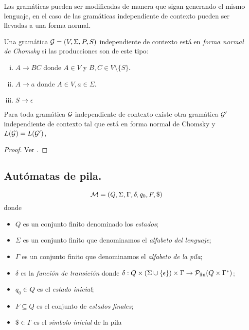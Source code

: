 \documentclass[tesis.tex]{subfiles}
\begin{document}
Las gramáticas pueden ser modificadas de manera que sigan generando el mismo lenguaje, en el caso de las gramáticas independiente de contexto pueden ser llevadas a una forma normal.

\begin{deff}
	Una gramática ${\cal G} = (V, \Sigma, P, S)$ independiente de contexto está en \emph{forma normal de Chomsky} si las producciones son de este tipo:
	\begin{enumerate}[i)]
		\item $A \to BC$ donde $A\in V$ y $B,C \in V \setminus \{ S \}$.
		\item $A \to a$ donde $A \in V, a \in \Sigma$.
		\item $S \to \epsilon$ 
	\end{enumerate}
\end{deff}

\begin{prop}\label{prop_fn_Chomsky}
	Para toda gramática $\cal G$ independiente de contexto existe otra gramática $\cal G'$ independiente de contexto tal que está en forma normal de Chomsky y $L({\cal G}) = L(\cal G')$,
\end{prop}

\begin{proof}
	Ver \cite[pp.274-275]{hopcraft-ullman}.
\end{proof}





\subsection{Autómatas de pila.}
\begin{deff}\label{deff_apnd}
	\[
	{\cal M } = (Q, \Sigma, \Gamma, \delta, q_0, F, \$)
	\]
	donde 
	\begin{itemize}
		\item $Q$ es un conjunto finito denominado los \emph{estados};
		\item $\Sigma$ es un conjunto finito que denominamos el \emph{alfabeto del lenguaje};
		\item $\Gamma$ es un conjunto finito que denominamos el \emph{alfabeto de la pila};
		\item $\delta$ es la \emph{función de transición} donde $\delta: Q  \times (\Sigma \cup \{ \epsilon \}) \times \Gamma \to {\cal P}_{\textrm{fin}}( Q  \times \Gamma^*)$;
		\item $q_0 \in Q$ es el \emph{estado inicial};
		\item $F \subseteq Q$ es el conjunto de \emph{estados finales};
		\item $\$ \in \Gamma$ es el \emph{símbolo inicial} de la pila
	\end{itemize}
\end{deff}
\end{document}
